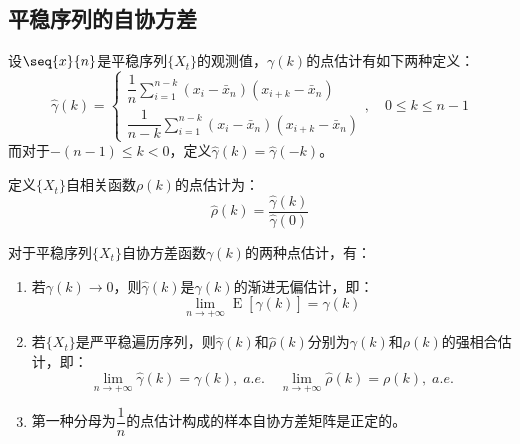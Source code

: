 \subsection{平稳序列的自协方差}
\begin{definition}
	设$\seq{x}{n}$是平稳序列$\{X_t\}$的观测值，$\gamma(k)$的点估计有如下两种定义：
	\begin{equation*}
		\hat{\gamma}(k)=
		\begin{cases}
			\dfrac{1}{n}\sum\limits_{i=1}^{n-k}(x_i-\bar{x}_n)(x_{i+k}-\bar{x}_n) \\
			\dfrac{1}{n-k}\sum\limits_{i=1}^{n-k}(x_i-\bar{x}_n)(x_{i+k}-\bar{x}_n)
		\end{cases},\quad 0\leqslant k\leqslant n-1
	\end{equation*}
	而对于$-(n-1)\leqslant k<0$，定义$\hat{\gamma}(k)=\hat{\gamma}(-k)$。\par
	定义$\{X_t\}$自相关函数$\rho(k)$的点估计为：
	\begin{equation*}
		\hat{\rho}(k)=\frac{\hat{\gamma}(k)}{\hat{\gamma}(0)}
	\end{equation*}
\end{definition}
\begin{theorem}\label{theo:StationarySeriesAutoCovariancePE}
	对于平稳序列$\{X_t\}$自协方差函数$\gamma(k)$的两种点估计，有：
	\begin{enumerate}
		\item 若$\gamma(k)\to0$，则$\hat{\gamma}(k)$是$\gamma(k)$的渐进无偏估计，即：
		\begin{equation*}
			\lim_{n\to+\infty}\operatorname{E}[\hat{\gamma}(k)]=\gamma(k)
		\end{equation*}
		\item 若$\{X_t\}$是严平稳遍历序列，则$\hat{\gamma}(k)$和$\hat{\rho}(k)$分别为$\gamma(k)$和$\rho(k)$的强相合估计，即：
		\begin{equation*}
			\lim_{n\to+\infty}\hat{\gamma}(k)=\gamma(k),\;a.e.\quad
			\lim_{n\to+\infty}\hat{\rho}(k)=\rho(k),\;a.e.
		\end{equation*}
		\item 第一种分母为$\dfrac{1}{n}$的点估计构成的样本自协方差矩阵是正定的。
	\end{enumerate}
\end{theorem}
